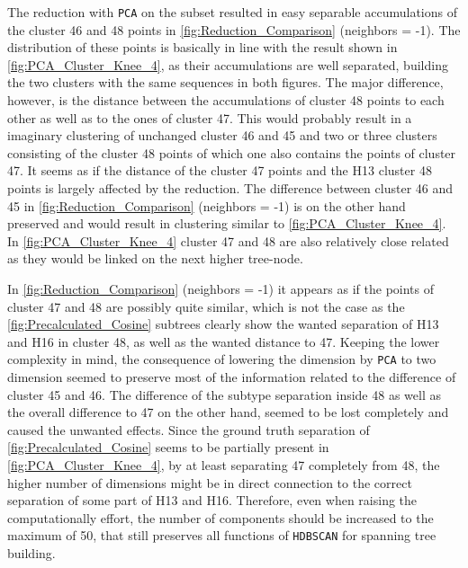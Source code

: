 \vspace{1em}

The reduction with \texttt{PCA} on the subset resulted in easy separable accumulations of the cluster 46 and 48 points in \autoref{fig:Reduction_Comparison} (neighbors = -1). The distribution of these points is basically in line with the result shown in \autoref{fig:PCA_Cluster_Knee_4}, as their accumulations are well separated, building the two clusters with the same sequences in both figures. The major difference, however, is the distance between the accumulations of cluster 48 points to each other as well as to the ones of cluster 47. This would probably result in a imaginary clustering of unchanged cluster 46 and 45 and two or three clusters consisting of the cluster 48 points of which one also contains the points of cluster 47. It seems as if the distance of the cluster 47 points and the H13 cluster 48 points is largely affected by the reduction. The difference between cluster 46 and 45 in \autoref{fig:Reduction_Comparison} (neighbors = -1) is on the other hand preserved and would result in clustering similar to \autoref{fig:PCA_Cluster_Knee_4}. In \autoref{fig:PCA_Cluster_Knee_4} cluster 47 and 48 are also relatively close related as they would be linked on the next higher tree-node.

\vspace{1em}

In \autoref{fig:Reduction_Comparison} (neighbors = -1) it appears as if the points of cluster 47 and 48 are possibly quite similar, which is not the case as the \autoref{fig:Precalculated_Cosine} subtrees clearly show the wanted separation of H13 and H16 in cluster 48, as well as the wanted distance to 47. Keeping the lower complexity in mind, the consequence of lowering the dimension by \texttt{PCA} to two dimension seemed to preserve most of the information related to the difference of cluster 45 and 46. The difference of the subtype separation inside 48 as well as the overall difference to 47 on the other hand, seemed to be lost completely and caused the unwanted effects. Since the ground truth separation of \autoref{fig:Precalculated_Cosine} seems to be partially present in \autoref{fig:PCA_Cluster_Knee_4}, by at least separating 47 completely from 48, the higher number of dimensions might be in direct connection to the correct separation of some part of H13 and H16. Therefore, even when raising the computationally effort, the number of components should be increased to the maximum of 50, that still preserves all functions of \texttt{HDBSCAN} for spanning tree building. 

